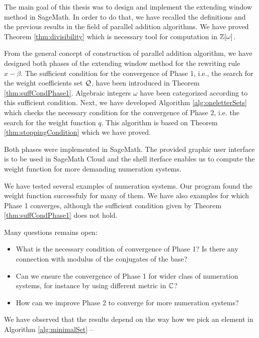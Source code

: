 The main goal of this thesis was to design and implement the extending window method in SageMath. In order to do that, we have recalled the definitions and the previous results in the field of parallel addition algorithms. We have proved Theorem \ref{thm:divisibility} which is necessary tool for computation in $\mathbb{Z}[\omega]$.

From the general concept of construction of parallel addition algorithm, we have designed both phases of the extending window method for the rewriting rule $x-\beta$. The sufficient condition for the convergence of Phase 1, i.e., the search for the weight coefficients set $\mathcal{Q}$, have been introduced in Theorem \ref{thm:suffCondPhase1}. Algebraic integers $\omega$ have been categorized according to this sufficient condition. Next, we have developed Algorithm \ref{alg:oneletterSets} which checks the necessary condition for the convergence of Phase 2, i.e. the search for the weight function $q$. This algorithm is based on Theorem \ref{thm:stoppingCondition} which we have proved.

Both phases were implemented in SageMath. The provided graphic user interface is  to be used in SageMath Cloud and the shell iterface enables us to compute the weight function for more demanding numeration systems.

We have tested several examples of numeration systems. Our program found the weight function successfuly for many of them. We have also examples for which Phase 1 converges, although the sufficient condition given by Theorem \ref{thm:suffCondPhase1} does not hold. 

Many questions remains open:
\begin{itemize}
\item What is the necessary condition of convergence of Phase 1? Is there any connection with modulus of the conjugates of the base?
\item Can we ensure the convergence of Phase 1 for wider class of numeration systems, for instance by using different metric in $\mathbb{C}$?
\item How can we improve Phase 2 to converge for more numeration systems?
\end{itemize}



We have observed that the results depend on the way how we pick an element in Algorithm \ref{alg:minimalSet} -- 